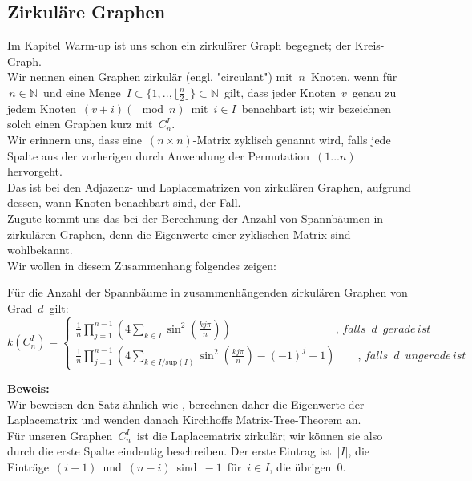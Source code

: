 \subsection{Zirkuläre Graphen}
Im Kapitel Warm-up ist uns schon ein zirkulärer Graph begegnet; der Kreis-Graph.\\
Wir nennen einen Graphen zirkulär (engl. "circulant") mit $\,n\,$ Knoten, wenn für $\,n \in \mathbb{N}\,$ und eine Menge $\,I \subset{\{1,..,\lfloor \frac{n}{2} \rfloor \}}\subset{\mathbb{N}}\,$ gilt, dass jeder Knoten $\,v\,$ genau zu jedem Knoten $\,(v+i) (\mod{n})\,$ mit $\,i \in I\,$ benachbart ist; wir bezeichnen solch einen Graphen kurz mit $\,C_n^I$.\;\\
Wir erinnern uns, dass eine $\,(n\times n)$-Matrix zyklisch genannt wird, falls jede Spalte aus der vorherigen durch Anwendung der Permutation $\,(1...n)\,$ hervorgeht.\\
Das ist bei den Adjazenz- und Laplacematrizen von zirkulären Graphen, aufgrund dessen, wann Knoten benachbart sind, der Fall.\\
Zugute kommt uns das bei der Berechnung der Anzahl von Spannbäumen in zirkulären Graphen, denn die Eigenwerte einer zyklischen Matrix sind wohlbekannt.\\
Wir wollen in diesem Zusammenhang folgendes zeigen:
\begin{Tms}
Für die Anzahl der Spannbäume in zusammenhängenden zirkulären Graphen von Grad $\,d\,$ gilt:\\
\begin{equation}
\mathit{k}\left( C_n^I \right) = 
 \begin{cases}
\frac{1}{n} \prod_{j=1}^{n-1} \left(4 \sum_{k \in I} \sin^2 \left( \frac{kj\pi}{n}\right) \right)\qquad\qquad\qquad\qquad\quad\; ,\,falls\,\,\,d\,\,\,gerade\,ist\\
\frac{1}{n} \prod_{j=1}^{n-1} \left(4 \sum_{k \in I/\mathrm{sup}(I)} \sin^2 \left( \frac{kj\pi}{n}\right)-(-1)^j+1\right)\qquad,\,falls\,\,\,d\,\,\,ungerade\,ist
\end{cases}
\end{equation}
\label{tmc}
\end{Tms}
\textbf{Beweis:}\\
Wir beweisen den Satz ähnlich wie \cite{wang_yang_1984}, berechnen daher die Eigenwerte der Laplacematrix und wenden danach Kirchhoffs Matrix-Tree-Theorem an.\\
Für unseren Graphen $\,C_n^I\,$ ist die Laplacematrix zirkulär; wir können sie also durch die erste Spalte eindeutig beschreiben. Der erste Eintrag ist $\,|I|$,\; die Einträge $\,(i+1)\,$  und $\,(n-i)\,$ sind $\,-1\,$ für $\,i \in I$,\; die übrigen $\,0$.\;\\
